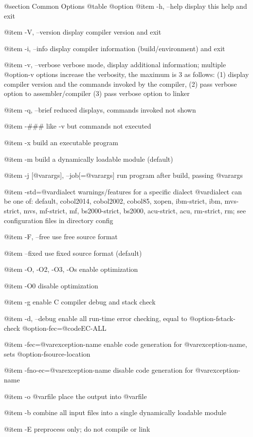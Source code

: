 @section Common Options
@table @option
@item -h, --help
display this help and exit

@item -V, --version
display compiler version and exit

@item -i, --info
display compiler information (build/environment)
and exit

@item -v, --verbose
verbose mode, display additional information;
multiple @option{-v} options increase the verbosity,
the maximum is 3 as follows:
(1) display compiler version and the commands
invoked by the compiler,
(2) pass verbose option to assembler/compiler
(3) pass verbose option to linker

@item -q, --brief
reduced displays, commands invoked not shown

@item -###
like -v but commands not executed

@item -x
build an executable program

@item -m
build a dynamically loadable module (default)

@item -j [@var{args}], --job[=@var{args}]
run program after build, passing @var{args}

@item -std=@var{dialect}
warnings/features for a specific dialect
@var{dialect} can be one of:
default, cobol2014, cobol2002, cobol85, xopen,
ibm-strict, ibm, mvs-strict, mvs,
mf-strict, mf, bs2000-strict, bs2000,
acu-strict, acu, rm-strict, rm;
see configuration files in directory config

@item -F, --free
use free source format

@item --fixed
use fixed source format (default)

@item -O, -O2, -O3, -Os
enable optimization

@item -O0
disable optimization

@item -g
enable C compiler debug and stack check

@item -d, --debug
enable all run-time error checking,
equal to @option{-fstack-check} @option{-fec=}@code{EC-ALL}

@item -fec=@var{exception-name}
enable code generation for @var{exception-name},
sets @option{-fsource-location}

@item -fno-ec=@var{exception-name}
disable code generation for @var{exception-name}

@item -o @var{file}
place the output into @var{file}

@item -b
combine all input files into a single
dynamically loadable module

@item -E
preprocess only; do not compile or link

